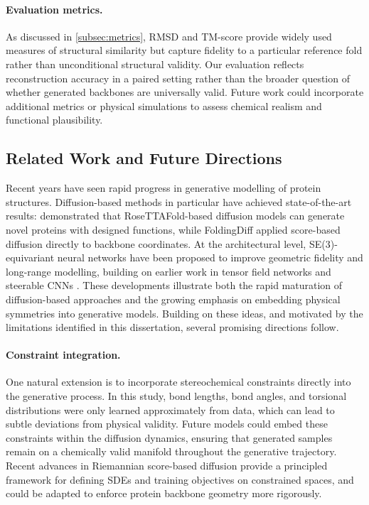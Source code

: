 \documentclass[a4paper,12pt]{article}
\begin{document}
\paragraph{Evaluation metrics.}  
As discussed in \cref{subsec:metrics}, RMSD and TM-score provide widely used measures of structural similarity but capture fidelity to a particular reference fold rather than unconditional structural validity. Our evaluation reflects reconstruction accuracy in a paired setting rather than the broader question of whether generated backbones are universally valid. Future work could incorporate additional metrics or physical simulations to assess chemical realism and functional plausibility.

\subsection{Related Work and Future Directions}\label{subsec:future-work}
Recent years have seen rapid progress in generative modelling of protein structures. Diffusion-based methods in particular have achieved state-of-the-art results: \citet{watsonNovoDesignProtein2023} demonstrated that RoseTTAFold-based diffusion models can generate novel proteins with designed functions, while FoldingDiff \citep{wuProteinStructureGeneration2024} applied score-based diffusion directly to backbone coordinates. At the architectural level, SE(3)-equivariant neural networks \citep{satorras2021EquivariantGraphNeural,geiger2022E3nnEuclideanNeural} have been proposed to improve geometric fidelity and long-range modelling, building on earlier work in tensor field networks and steerable CNNs \citep{thomasTensorFieldNetworks2018,weiler3DSteerableCNNs2018,kondorClebschGordanNetsFully2018}. These developments illustrate both the rapid maturation of diffusion-based approaches and the growing emphasis on embedding physical symmetries into generative models. Building on these ideas, and motivated by the limitations identified in this dissertation, several promising directions follow.

\paragraph{Constraint integration.}  
One natural extension is to incorporate stereochemical constraints directly into the generative process. In this study, bond lengths, bond angles, and torsional distributions were only learned approximately from data, which can lead to subtle deviations from physical validity. Future models could embed these constraints within the diffusion dynamics, ensuring that generated samples remain on a chemically valid manifold throughout the generative trajectory. Recent advances in Riemannian score-based diffusion \citep{debortoliRiemannianScoreBasedGenerative2022,huang2022RiemannianDiffusionModels,chungImprovingDiffusionModels2022} provide a principled framework for defining SDEs and training objectives on constrained spaces, and could be adapted to enforce protein backbone geometry more rigorously.
\end{document}
